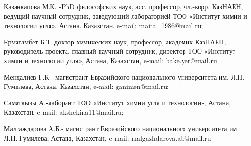 \begin{noparindent}
Казанкапова М.К. -PhD философских наук, асс. профессор, чл.-корр.
КазНАЕН, ведущий научный сотрудник, заведующий лабораторией ТОО
«Институт химии и технологии угля», Астана, Казахстан, e-mail:
maira\_1986@mail.ru;

Ермагамбет Б.Т.-доктор химических наук, профессор, академик КазНАЕН,
руководитель проекта, главный научный сотрудник, директор ТОО «Институт
химии и технологии угля», Астана, Казахстан, e-mail: bake.yer@mail.ru;

Мендалиев Г.К.- магистрант Евразийского национального университета им.
Л.Н. Гумилева, Астана, Казахстан, e-mail: ganimen@mail.ru;

Саматкызы А.{\bfseries -}лаборант ТОО «Институт химии угля и технологии»,
Астана, Казахстан, e-mail: akshekina11@mail.ru;

Малгаждарова А.Б.- магистрант Евразийского национального университета
им. Л.Н. Гумилева, Астана, Казахстан, e-mail: malgazhdarova.ab@mail.ru
\end{noparindent}
